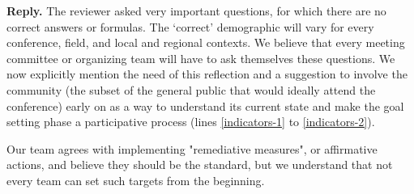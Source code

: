 \documentclass{article}
\newenvironment{Reply}{\noindent\color{BlueViolet}\textbf{Reply.}}{\vspace{1em}}
\begin{document}
\begin{Reply}
   The reviewer asked very important questions, for which there are no correct answers or formulas. 
   The `correct' demographic will vary for every conference, field, and local and regional contexts. 
   We believe that every meeting committee or organizing team will have to ask themselves these questions.
   We now explicitly mention the need of this reflection and a suggestion to involve the community (the subset of the general public that would ideally attend the conference) early on as a way to understand its current state and make the goal setting phase a participative process (lines \ref{indicators-1} to \ref{indicators-2}).
   
   Our team agrees with implementing "remediative measures", or affirmative actions, and believe they should be the standard, but we understand that not every team can set such targets from the beginning. %
   
   


\end{Reply}
\end{document}
